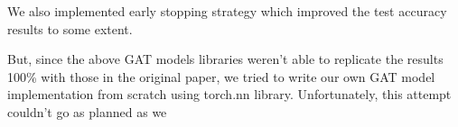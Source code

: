 We also implemented early stopping strategy which improved the test accuracy results to some extent.

But, since the above GAT models libraries weren't able to replicate the results 100\% with those in the original paper,
we tried to write our own GAT model implementation from scratch using torch.nn library.
Unfortunately, this attempt couldn't go as planned as we
